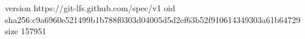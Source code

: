 version https://git-lfs.github.com/spec/v1
oid sha256:c9a6960e521499b1b788f0303d04005d5d2ef63b52f910614349303a61b64729
size 157951
